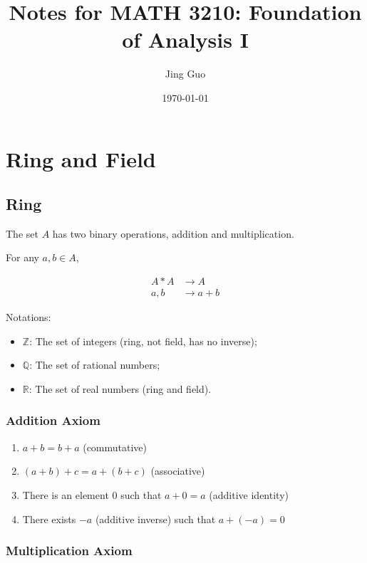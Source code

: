 \documentclass{article}
\title{Notes for MATH 3210: Foundation of Analysis I}
\author{Jing Guo}
\date{\today}
\begin{document}
    \maketitle
    \tableofcontents
    
    \section{Ring and Field}
    
    \subsection{Ring}
    
    The set $A$ has two binary operations, addition and multiplication.
    
    For any $a, b \in A$,
    
    \begin{align*}
        A \ast A &\to A \\
        a, b &\to a + b
    \end{align*}
    
    Notations:
    
    \begin{itemize}
        \item $\mathbb{Z}$: The set of integers (ring, not field, has no inverse);
        \item $\mathbb{Q}$: The set of rational numbers;
        \item $\mathbb{R}$: The set of real numbers (ring and field).
    \end{itemize}
    
    \subsubsection{Addition Axiom}

    \begin{enumerate}
        \item $a + b = b + a$ (commutative)
        \item $(a + b) + c = a + (b + c)$ (associative)
        \item There is an element $0$ such that $a + 0 = a$ (additive identity)
        \item There exists $-a$ (additive inverse) such that $a + (-a) = 0$
    \end{enumerate}

    \subsubsection{Multiplication Axiom}
    
\end{document}
